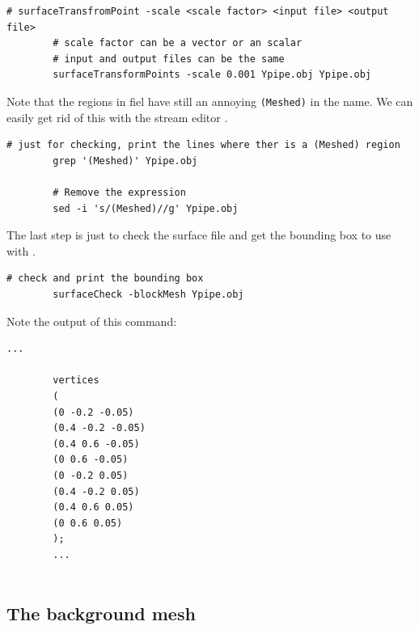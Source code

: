 \documentclass[
parskip=half,      %
DIV=12,            %
headings=normal,   %
fontsize=11pt,     %
english            %
]{scrartcl}
\begin{document}
	\begin{lstlisting}[style=terminal, caption={Scale of the surface file.}]
		# surfaceTransfromPoint -scale <scale factor> <input file> <output file>
		# scale factor can be a vector or an scalar
		# input and output files can be the same
		surfaceTransformPoints -scale 0.001 Ypipe.obj Ypipe.obj
	\end{lstlisting}
	
	Note that the regions in  fiel have still an annoying \texttt{(Meshed)} 
	in the name. We can easily get rid of this with the stream editor .
	
	\begin{lstlisting}[style=terminal, caption={Removing the \texttt{(Meshed)} in the surface file.}]
		# just for checking, print the lines where ther is a (Meshed) region
		grep '(Meshed)' Ypipe.obj
		
		# Remove the expression
		sed -i 's/(Meshed)//g' Ypipe.obj
	\end{lstlisting}
	
	
	The last step is just to check the surface file and get the bounding box to use with .
	
	\begin{lstlisting}[style=terminal]
		# check and print the bounding box
		surfaceCheck -blockMesh Ypipe.obj
	\end{lstlisting}
	
	Note the output of this command:
	
	\begin{lstlisting}[style=output]
		...
		
		vertices
		(
		(0 -0.2 -0.05)
		(0.4 -0.2 -0.05)
		(0.4 0.6 -0.05)
		(0 0.6 -0.05)
		(0 -0.2 0.05)
		(0.4 -0.2 0.05)
		(0.4 0.6 0.05)
		(0 0.6 0.05)
		);
		...
		
	\end{lstlisting}
	
	\subsection{The background mesh}
	
\end{document}
